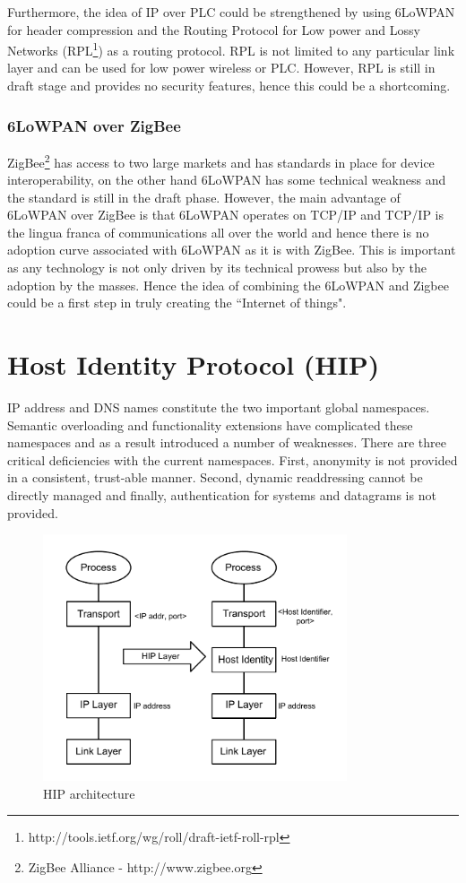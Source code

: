Furthermore, the idea of IP over PLC could be strengthened by using 6LoWPAN for header compression and the Routing Protocol for Low power and Lossy Networks (RPL\footnote{http://tools.ietf.org/wg/roll/draft-ietf-roll-rpl}) as  a routing protocol. RPL is not limited to any particular link layer and can be used for low power wireless or PLC. However, RPL is still in draft stage and provides no security features, hence this could be a shortcoming.

\subsubsection{6LoWPAN over ZigBee}
ZigBee\footnote{ZigBee Alliance - http://www.zigbee.org} has access to two large markets and has standards in place for device interoperability, on the other hand 6LoWPAN has some technical weakness and the standard is still in the draft phase. However, the main advantage of 6LoWPAN over ZigBee is that 6LoWPAN operates on TCP/IP and TCP/IP is the lingua franca of communications all over the world and hence there is no adoption curve associated with 6LoWPAN as it is with ZigBee. This is important as any technology is not only driven by its technical prowess but also by the adoption by the masses. Hence the idea of combining the 6LoWPAN and Zigbee could be a first step in truly creating the ``Internet of things". 

\section {Host Identity Protocol (HIP)}

IP address and DNS names constitute the two important global namespaces. Semantic overloading and functionality extensions have complicated these namespaces and as a result introduced a number of weaknesses. There are three critical deficiencies with the current namespaces.  First, anonymity is not provided in a consistent, trust-able manner. Second, dynamic readdressing cannot be directly managed and finally, authentication for systems and datagrams is not provided.

\begin{figure}[htb!]
\centering
\includegraphics[width=0.8\textwidth]{images/HIP_figure1}
\caption{HIP architecture}
\label{fig:HIP_arch}
\end{figure}

